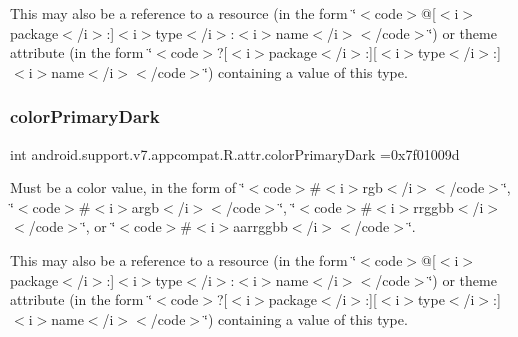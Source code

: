 This may also be a reference to a resource (in the form \char`\"{}$<$code$>$@\mbox{[}$<$i$>$package$<$/i$>$\+:\mbox{]}$<$i$>$type$<$/i$>$\+:$<$i$>$name$<$/i$>$$<$/code$>$\char`\"{}) or theme attribute (in the form \char`\"{}$<$code$>$?\mbox{[}$<$i$>$package$<$/i$>$\+:\mbox{]}\mbox{[}$<$i$>$type$<$/i$>$\+:\mbox{]}$<$i$>$name$<$/i$>$$<$/code$>$\char`\"{}) containing a value of this type. \mbox{\label{classandroid_1_1support_1_1v7_1_1appcompat_1_1R_1_1attr_a0efae796c8c67d83a21ff5aeb199c447}} 
\subsubsection{\texorpdfstring{color\+Primary\+Dark}{colorPrimaryDark}}
{\footnotesize\ttfamily int android.\+support.\+v7.\+appcompat.\+R.\+attr.\+color\+Primary\+Dark =0x7f01009d\hspace{0.3cm}{\ttfamily [static]}}

Must be a color value, in the form of \char`\"{}$<$code$>$\#$<$i$>$rgb$<$/i$>$$<$/code$>$\char`\"{}, \char`\"{}$<$code$>$\#$<$i$>$argb$<$/i$>$$<$/code$>$\char`\"{}, \char`\"{}$<$code$>$\#$<$i$>$rrggbb$<$/i$>$$<$/code$>$\char`\"{}, or \char`\"{}$<$code$>$\#$<$i$>$aarrggbb$<$/i$>$$<$/code$>$\char`\"{}. 

This may also be a reference to a resource (in the form \char`\"{}$<$code$>$@\mbox{[}$<$i$>$package$<$/i$>$\+:\mbox{]}$<$i$>$type$<$/i$>$\+:$<$i$>$name$<$/i$>$$<$/code$>$\char`\"{}) or theme attribute (in the form \char`\"{}$<$code$>$?\mbox{[}$<$i$>$package$<$/i$>$\+:\mbox{]}\mbox{[}$<$i$>$type$<$/i$>$\+:\mbox{]}$<$i$>$name$<$/i$>$$<$/code$>$\char`\"{}) containing a value of this type. \mbox{\label{classandroid_1_1support_1_1v7_1_1appcompat_1_1R_1_1attr_a4db6b3cd94eafb766c1d4a6c42239dc5}} 
